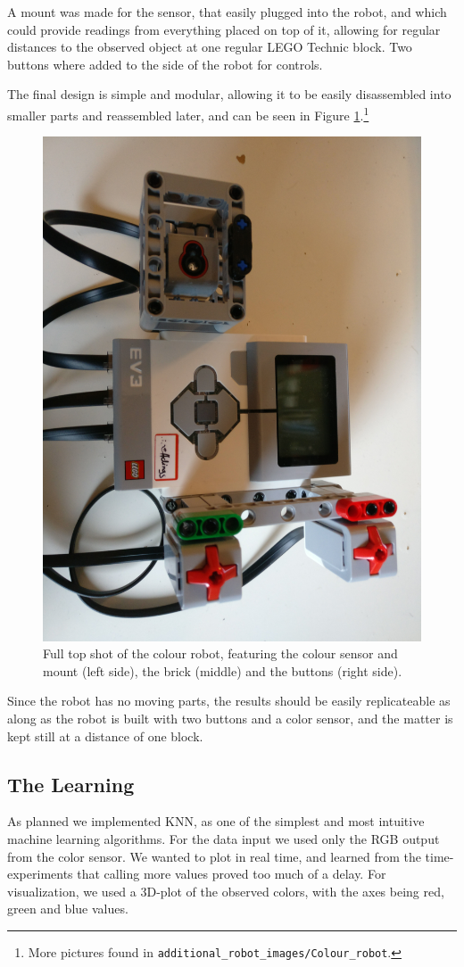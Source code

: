 \documentclass[11pt, a4paper]{article}
\begin{document}
	A mount was made for the sensor, that easily plugged into the robot, and which could provide readings from everything placed on top of it, allowing for regular distances to the observed object at one regular LEGO Technic block. Two buttons where added to the side of the robot for controls.
	
	The final design is simple and modular, allowing it to be easily disassembled into smaller parts and reassembled later, and can be seen in Figure \ref{fig:colour_robot_full_shot}.\footnote{More pictures found in \texttt{additional\_robot\_images/Colour\_robot}.}
	
	\begin{figure}[H]
		\centering
		\includegraphics[angle=90,width=0.6\linewidth]{images/colour_robot_full.jpg} 	
		\caption{Full top shot of the colour robot, featuring the colour sensor and mount (left side), the brick (middle) and the buttons (right side).}
		\label{fig:colour_robot_full_shot}
	\end{figure}
	Since the robot has no moving parts, the results should be easily replicateable as along as the robot is built with two buttons and a color sensor, and the matter is kept still at a distance of one block.
	\subsection{The Learning}
	As planned we implemented KNN, as one of the simplest and most intuitive machine learning algorithms. For the data input we used only the RGB output from the color sensor. We wanted to plot in real time, and learned from the time-experiments that calling more values proved too much of a delay. For visualization, we used a 3D-plot of the observed colors, with the axes being red, green and blue values.
	
\end{document}
